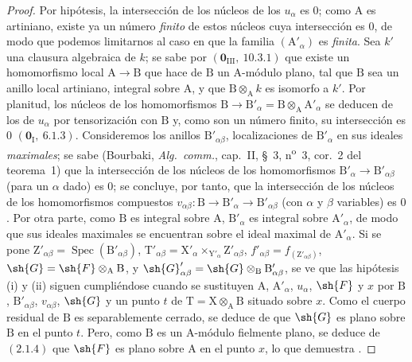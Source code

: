 \begin{proof}
Por hipótesis, la intersección de los núcleos de los $u_\alpha$ es $0$; como $\mathrm{A}$ es artiniano,
existe ya un número \emph{finito} de estos núcleos cuya intersección es $0$, de modo que podemos
limitarnos al caso en que la familia $(\mathrm{A}'_\alpha)$ es \emph{finita}. Sea $k'$ una clausura algebraica de $k$; se sabe
por $(\mathbf{0}_{\mathrm{III}},~10.3.1)$ que existe un homomorfismo local $\mathrm{A}\to\mathrm{B}$ que hace de $\mathrm{B}$ un $\mathrm{A}$-módulo plano,
tal que $\mathrm{B}$ sea un anillo local artiniano, integral sobre $\mathrm{A}$, y que $\mathrm{B}\otimes_\mathrm{A} k$ es isomorfo a $k'$.
Por planitud, los núcleos de los homomorfismos $\mathrm{B}\to\mathrm{B}'_\alpha=\mathrm{B}\otimes_\mathrm{A}\mathrm{A}'_\alpha$ se deducen de los de
$u_\alpha$ por tensorización con $\mathrm{B}$ y, como son un número finito, su intersección es
$0$ $(\mathbf{0}_\mathrm{I},~6.1.3)$. Consideremos los anillos $\mathrm{B}'_{\alpha\beta}$, localizaciones de $\mathrm{B}'_\alpha$ en sus ideales \emph{maximales};
se sabe (Bourbaki, \emph{Alg.\ comm.}, cap.~II, \S~3, n\textsuperscript{o}~3, cor.~2 del teorema~1) que la intersección
de los núcleos de los homomorfismos $\mathrm{B}'_\alpha\to\mathrm{B}'_{\alpha\beta}$ (para un $\alpha$ dado) es $0$; se concluye, por tanto,
que la intersección de los núcleos de los homomorfismos compuestos $v_{\alpha\beta}:\mathrm{B}\to\mathrm{B}'_\alpha\to\mathrm{B}'_{\alpha\beta}$ (con $\alpha$ y
$\beta$ variables) es $0$. Por otra parte, como $\mathrm{B}$ es integral sobre $\mathrm{A}$, $\mathrm{B}'_\alpha$ es integral sobre $\mathrm{A}'_\alpha$,
de modo que sus ideales maximales se encuentran sobre el ideal maximal de $\mathrm{A}'_\alpha$. Si se pone
$\mathrm{Z}'_{\alpha\beta}=\operatorname{Spec}(\mathrm{B}'_{\alpha\beta})$,
$\mathrm{T}'_{\alpha\beta}=\mathrm{X}'_\alpha\times_{\mathrm{Y}'_\alpha}\mathrm{Z}'_{\alpha\beta}$,
$f'_{\alpha\beta}=f_{(\mathrm{Z}'_{\alpha\beta})}$,
$\sh{G}=\sh{F}\otimes_\mathrm{A}\mathrm{B}$, y
$\sh{G}'_{\alpha\beta}=\sh{G}\otimes_\mathrm{B}\mathrm{B}'_{\alpha\beta}$, se ve
que las hipótesis (i) y (ii) siguen cumpliéndose cuando se sustituyen
$\mathrm{A}$, $\mathrm{A}'_\alpha$, $u_\alpha$, $\sh{F}$ y $x$ por $\mathrm{B}$, $\mathrm{B}'_{\alpha\beta}$, $v_{\alpha\beta}$, $\sh{G}$ y un punto $t$ de $\mathrm{T}=\mathrm{X}\otimes_\mathrm{A}\mathrm{B}$ situado sobre $x$.
Como el cuerpo residual de $\mathrm{B}$ es separablemente cerrado, se deduce de  que
$\sh{G}$ es plano sobre $\mathrm{B}$ en el punto $t$. Pero, como $\mathrm{B}$ es un $\mathrm{A}$-módulo fielmente plano, se deduce de $(2.1.4)$
que $\sh{F}$ es plano sobre $\mathrm{A}$ en el punto $x$, lo que demuestra .
\end{proof}

